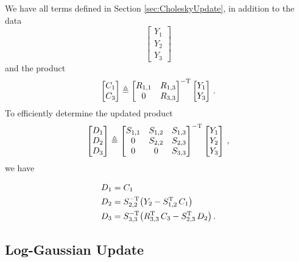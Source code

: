 \documentclass{acmsmall}
\begin{document}
We have all terms defined in Section \ref{sec:CholeskyUpdate}, in addition to the data $$\begin{bmatrix} Y_1\\Y_2\\Y_3 \end{bmatrix}$$ and the product $$\begin{bmatrix} C_1\\C_3 \end{bmatrix}\triangleq\begin{bmatrix} R_{1,1} & R_{1,3} \\ 0 & R_{3,3} \end{bmatrix}^{-\mathrm{T}} \begin{bmatrix} Y_1\\Y_3 \end{bmatrix}\,.$$ To efficiently determine the updated product $$\begin{bmatrix} D_1\\D_2\\D_3 \end{bmatrix}\triangleq\begin{bmatrix} S_{1,1} & S_{1,2} & S_{1,3} \\ 0 & S_{2,2} & S_{2,3} \\ 0 & 0 & S_{3,3} \end{bmatrix}^{-\mathrm{T}} \begin{bmatrix} Y_1\\Y_2\\Y_3 \end{bmatrix}\,,$$ we have

\begin{align}
 D_{1}&=C_{1}\\
D_{2} &=S_{2,2}^{-\mathrm{T}}\big(Y_2-S_{1,2}^{\mathrm{T}}\,C_1\big)\\
D_{3}&=S_{3,3}^{-\mathrm{T}}\big(R_{3,3}^{\mathrm{T}} \, C_3-S_{2,3}^{\mathrm{T}}\,D_2\big)\,.
\end{align}

\subsection{Log-Gaussian Update} \label{sec:LogGaussianUpdate}
\end{document}

